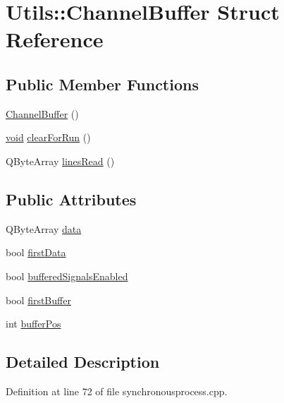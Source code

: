 \hypertarget{struct_utils_1_1_channel_buffer}{\section{\-Utils\-:\-:\-Channel\-Buffer \-Struct \-Reference}
\label{struct_utils_1_1_channel_buffer}
}
\subsection*{\-Public \-Member \-Functions}
\begin{DoxyCompactItemize}
\item 
\hyperlink{struct_utils_1_1_channel_buffer_a28510643b1efd9e8446e2d6c9bbfd616}{\-Channel\-Buffer} ()
\item 
\hyperlink{group___u_a_v_objects_plugin_ga444cf2ff3f0ecbe028adce838d373f5c}{void} \hyperlink{struct_utils_1_1_channel_buffer_ad4e57e4c3a68b76bbefafa2c8599675b}{clear\-For\-Run} ()
\item 
\-Q\-Byte\-Array \hyperlink{struct_utils_1_1_channel_buffer_a7a6b0e4a572dd21eb4ee4bea550cd3e5}{lines\-Read} ()
\end{DoxyCompactItemize}
\subsection*{\-Public \-Attributes}
\begin{DoxyCompactItemize}
\item 
\-Q\-Byte\-Array \hyperlink{struct_utils_1_1_channel_buffer_aec15c168afb035f27ef4cefc5825ac66}{data}
\item 
bool \hyperlink{struct_utils_1_1_channel_buffer_acb0128e17057f24d11abcb41acfd2da4}{first\-Data}
\item 
bool \hyperlink{struct_utils_1_1_channel_buffer_a604565db9d7f8ee949013e67140d4dbf}{buffered\-Signals\-Enabled}
\item 
bool \hyperlink{struct_utils_1_1_channel_buffer_ac695882231416a6a43841faf53242fbc}{first\-Buffer}
\item 
int \hyperlink{struct_utils_1_1_channel_buffer_aa968a408a1f0a7cfa1dc83c2ea665ef5}{buffer\-Pos}
\end{DoxyCompactItemize}


\subsection{\-Detailed \-Description}


\-Definition at line 72 of file synchronousprocess.\-cpp.



